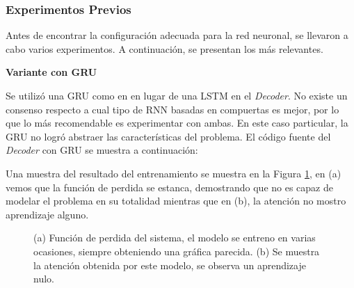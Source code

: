 \subsubsection{Experimentos Previos}

Antes de encontrar la configuración adecuada para la red neuronal, se llevaron a cabo varios experimentos. A continuación, se presentan los más relevantes.

\vspace{1em}
\textbf{Variante con GRU}
\vspace{1em}

Se utilizó una GRU como en \cite{gru} en lugar de una LSTM en el \textit{Decoder}. No existe un consenso respecto a cual tipo de RNN basadas en compuertas es mejor, por lo que lo más recomendable es experimentar con ambas. En este caso particular, la GRU no logró abstraer las características del problema. El código fuente del \textit{Decoder} con GRU se muestra a continuación:



Una muestra del resultado del entrenamiento se muestra en la Figura \ref{fig:gru-bad}, en (a) vemos que la función de perdida se estanca, demostrando que no es capaz de modelar el problema en su totalidad mientras que en (b), la atención no mostro aprendizaje alguno.

\begin{figure}[H]
    \centering
    \caption{(a) Función de perdida del sistema, el modelo se entreno en varias ocasiones, siempre obteniendo una gráfica parecida. (b) Se muestra la atención obtenida por este modelo, se observa un aprendizaje nulo.}
    \label{fig:gru-bad}
\end{figure}


